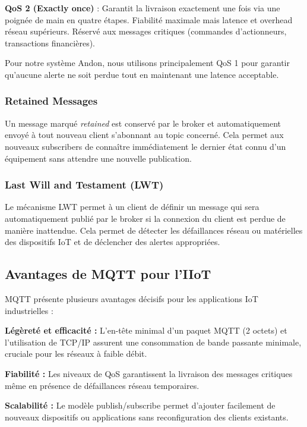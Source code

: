 \textbf{QoS 2 (Exactly once)} : Garantit la livraison exactement une fois via une poignée de main en quatre étapes. Fiabilité maximale mais latence et overhead réseau supérieurs. Réservé aux messages critiques (commandes d'actionneurs, transactions financières).

Pour notre système Andon, nous utilisons principalement QoS 1 pour garantir qu'aucune alerte ne soit perdue tout en maintenant une latence acceptable.

\subsubsection{Retained Messages}

Un message marqué \textit{retained} est conservé par le broker et automatiquement envoyé à tout nouveau client s'abonnant au topic concerné. Cela permet aux nouveaux subscribers de connaître immédiatement le dernier état connu d'un équipement sans attendre une nouvelle publication.

\subsubsection{Last Will and Testament (LWT)}

Le mécanisme LWT permet à un client de définir un message qui sera automatiquement publié par le broker si la connexion du client est perdue de manière inattendue. Cela permet de détecter les défaillances réseau ou matérielles des dispositifs IoT et de déclencher des alertes appropriées.


\subsection{Avantages de MQTT pour l'IIoT}

MQTT présente plusieurs avantages décisifs pour les applications IoT industrielles :

\textbf{Légèreté et efficacité :} L'en-tête minimal d'un paquet MQTT (2 octets) et l'utilisation de TCP/IP assurent une consommation de bande passante minimale, cruciale pour les réseaux à faible débit.

\textbf{Fiabilité :} Les niveaux de QoS garantissent la livraison des messages critiques même en présence de défaillances réseau temporaires.

\textbf{Scalabilité :} Le modèle publish/subscribe permet d'ajouter facilement de nouveaux dispositifs ou applications sans reconfiguration des clients existants.


